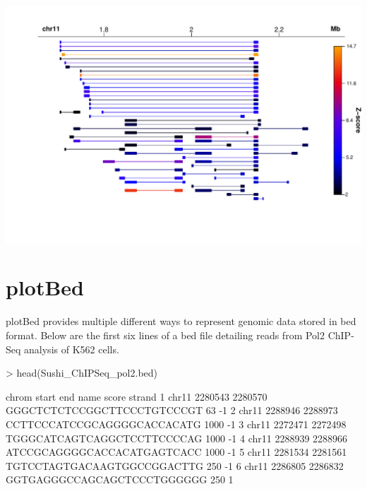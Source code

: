 \documentclass{article}
\begin{document}
\begin{center}

\begin{Schunk}
\end{Schunk}
\includegraphics{Sushi-023}

\end{center}


\section{plotBed}

plotBed provides multiple different ways to represent genomic data stored in bed format.  Below are the first six lines of a bed file detailing reads from Pol2 ChIP-Seq analysis of K562 cells.

\begin{Schunk}
\begin{Sinput}
>   head(Sushi_ChIPSeq_pol2.bed)
\end{Sinput}
\begin{Soutput}
  chrom   start     end                        name score strand
1 chr11 2280543 2280570 GGGCTCTCTCCGGCTTCCCTGTCCCGT    63     -1
2 chr11 2288946 2288973 CCTTCCCATCCGCAGGGGCACCACATG  1000     -1
3 chr11 2272471 2272498 TGGGCATCAGTCAGGCTCCTTCCCCAG  1000     -1
4 chr11 2288939 2288966 ATCCGCAGGGGCACCACATGAGTCACC  1000     -1
5 chr11 2281534 2281561 TGTCCTAGTGACAAGTGGCCGGACTTG   250     -1
6 chr11 2286805 2286832 GGTGAGGGCCAGCAGCTCCCTGGGGGG   250      1
\end{Soutput}
\end{Schunk}
\end{document}

